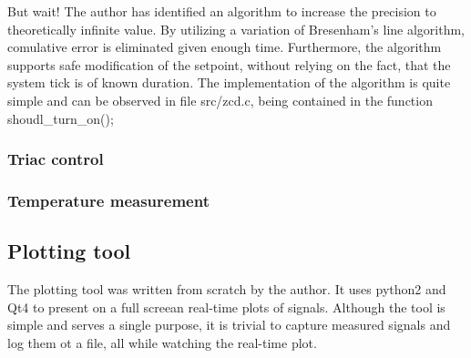 \par
But wait!
The author has identified an algorithm to increase the precision to theoretically infinite value.
By utilizing a variation of Bresenham's line algorithm, comulative error is eliminated given enough time.
Furthermore, the algorithm supports safe modification of the setpoint, without relying on the fact, that the system tick is of known duration.
The implementation of the algorithm is quite simple and can be observed in file src/zcd.c, being contained in the function shoudl\_turn\_on();

\subsubsection{Triac control}
\subsubsection{Temperature measurement}

\subsection{Plotting tool}
The plotting tool was written from scratch by the author.
It uses python2 and Qt4 to present on a full screean real-time plots of signals.
Although the tool is simple and serves a single purpose, it is trivial to capture measured signals and log them ot a file, all while watching the real-time plot.
